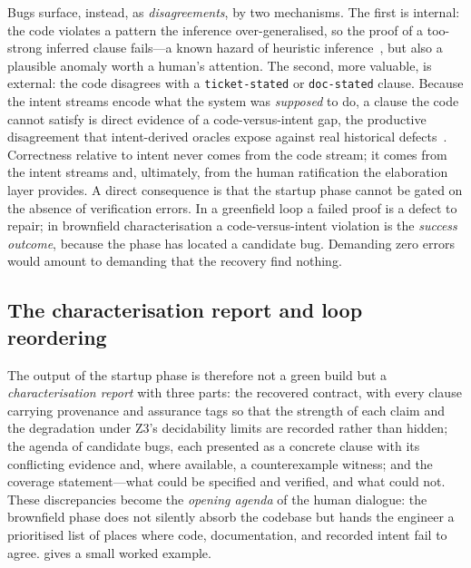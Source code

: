 Bugs surface, instead, as \emph{disagreements}, by two mechanisms. The first is internal: the code violates a pattern the inference over-generalised, so the proof of a too-strong inferred clause fails---a known hazard of heuristic inference~\cite{flanagan2001houdini}, but also a plausible anomaly worth a human's attention. The second, more valuable, is external: the code disagrees with a \texttt{ticket-stated} or \texttt{doc-stated} clause. Because the intent streams encode what the system was \emph{supposed} to do, a clause the code cannot satisfy is direct evidence of a code-versus-intent gap, the productive disagreement that intent-derived oracles expose against real historical defects~\cite{endres2024nl2postcond}. Correctness relative to intent never comes from the code stream; it comes from the intent streams and, ultimately, from the human ratification the elaboration layer provides. A direct consequence is that the startup phase cannot be gated on the absence of verification errors. In a greenfield loop a failed proof is a defect to repair; in brownfield characterisation a code-versus-intent violation is the \emph{success outcome}, because the phase has located a candidate bug. Demanding zero errors would amount to demanding that the recovery find nothing.

\subsection{The characterisation report and loop reordering}\label{subsec:a5-report}

The output of the startup phase is therefore not a green build but a \emph{characterisation report} with three parts: the recovered contract, with every clause carrying provenance and assurance tags so that the strength of each claim and the degradation under Z3's decidability limits are recorded rather than hidden; the agenda of candidate bugs, each presented as a concrete clause with its conflicting evidence and, where available, a counterexample witness; and the coverage statement---what could be specified and verified, and what could not. These discrepancies become the \emph{opening agenda} of the human dialogue: the brownfield phase does not silently absorb the codebase but hands the engineer a prioritised list of places where code, documentation, and recorded intent fail to agree.  gives a small worked example.

